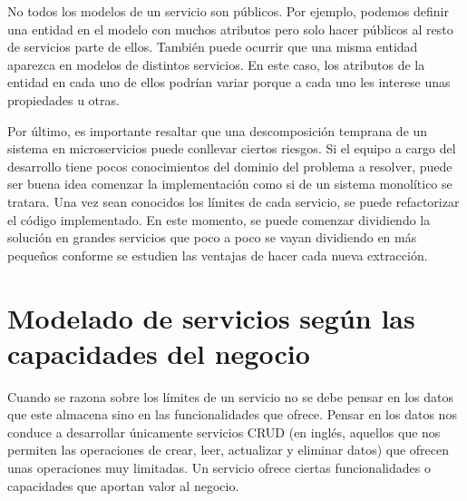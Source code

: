 \documentclass[11pt,a4paper]{article}
\begin{document}
No todos los modelos de un servicio son públicos. Por ejemplo, podemos definir una entidad en el modelo con muchos atributos pero solo hacer públicos al resto de servicios parte de ellos. También puede ocurrir que una misma entidad aparezca en modelos de distintos servicios. En este caso, los atributos de la entidad en cada uno de ellos podrían variar porque a cada uno les interese unas propiedades u otras.

Por último, es importante resaltar que una descomposición temprana de un sistema en microservicios puede conllevar ciertos riesgos. Si el equipo a cargo del desarrollo tiene pocos conocimientos del dominio del problema a resolver, puede  ser buena idea comenzar la implementación como si de un sistema monolítico se tratara. Una vez sean conocidos los límites de cada servicio, se puede refactorizar el código implementado. En este momento, se puede comenzar dividiendo la solución en grandes servicios que poco a poco se vayan dividiendo en más pequeños conforme se estudien las ventajas de hacer cada nueva extracción.

\section{Modelado de servicios según las capacidades del negocio}

Cuando se razona sobre los límites de un servicio no se debe pensar en los datos que este almacena sino en las funcionalidades que ofrece. Pensar en los datos nos conduce a desarrollar únicamente servicios CRUD (en inglés, aquellos que nos permiten las operaciones de crear, leer, actualizar y eliminar datos) que ofrecen unas operaciones muy limitadas. Un servicio ofrece ciertas funcionalidades o capacidades que aportan valor al negocio.
\end{document}
